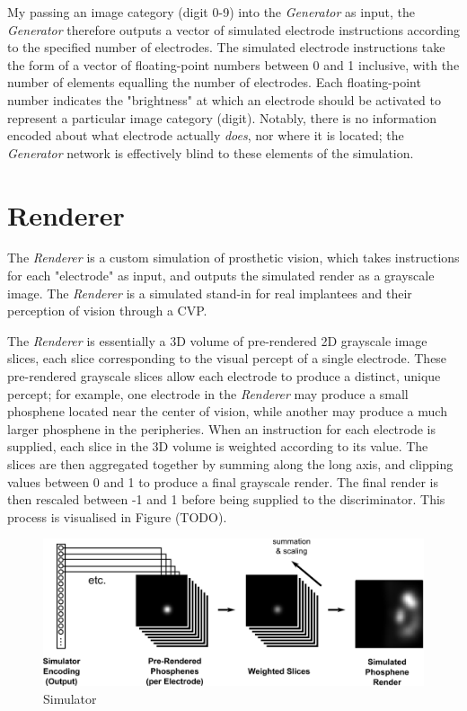 \documentclass[a4paper,11pt,openany]{book}
\begin{document}
My passing an image category (digit 0-9) into the \emph{Generator} as input, the \emph{Generator} therefore outputs a vector of simulated electrode instructions according to the specified number of electrodes.
The simulated electrode instructions take the form of a vector of floating-point numbers between 0 and 1 inclusive, with the number of elements equalling the number of electrodes.
Each floating-point number indicates the "brightness" at which an electrode should be activated to represent a particular image category (digit).
Notably, there is no information encoded about what electrode actually \emph{does}, nor where it is located; the \emph{Generator} network is effectively blind to these elements of the simulation.

\section*{Renderer}
\label{sec:orgcf6fc97}

The \emph{Renderer} is a custom simulation of prosthetic vision, which takes instructions for each "electrode" as input, and outputs the simulated render as a grayscale image.
The \emph{Renderer} is a simulated stand-in for real implantees and their perception of vision through a CVP.

The \emph{Renderer} is essentially a 3D volume of pre-rendered 2D grayscale image slices, each slice corresponding to the visual percept of a single electrode.
These pre-rendered grayscale slices allow each electrode to produce a distinct, unique percept; for example, one electrode in the \emph{Renderer} may produce a small phosphene located near the center of vision, while another may produce a much larger phosphene in the peripheries.
When an instruction for each electrode is supplied, each slice in the 3D volume is weighted according to its value.
The slices are then aggregated together by summing along the long axis, and clipping values between 0 and 1 to produce a final grayscale render.
The final render is then rescaled between -1 and 1 before being supplied to the discriminator.
This process is visualised in Figure (TODO).

\begin{figure}[htbp]
\centering
\includegraphics[width=.9\linewidth]{./images/methods_simulator.png}
\caption{\label{fig:org46ba80e}
Simulator}
\end{figure}
\end{document}
